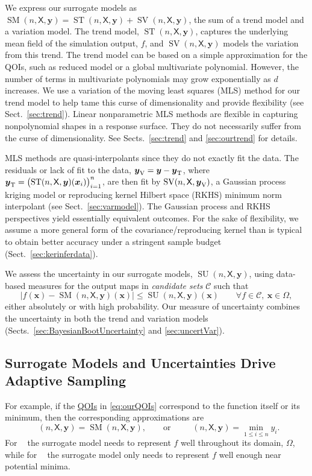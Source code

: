 \documentclass[11pt]{NSFamsart}
\newcommand{\QOIs}{\hyperlink{QOIlink}{QOIs}\xspace}
\DeclareMathOperator{\SURR}{SM} %
\DeclareMathOperator{\STREND}{ST} %
\DeclareMathOperator{\SVAR}{SV} %
\newcommand{\MLS}{\textrm{MLS}\xspace} %
\DeclareMathOperator{\MIN}{MIN}
\DeclareMathOperator{\ID}{ID}
\DeclareMathOperator{\APPMIN}{\widehat{\MIN}}
\DeclareMathOperator{\APPID}{\widehat{\ID}}
\DeclareMathOperator{\SURRERR}{SU}
\newcommand{\TREND}{\textup{T}}
\newcommand{\VAR}{\textup{V}}
\newcommand{\mX}{\mathsf{X}}
\newcommand{\bx}{{\boldsymbol{x}}}
\newcommand{\by}{{\boldsymbol{y}}}
\newcommand{\calc}{{\mathcal{C}}}
\def\abs#1{\ensuremath{\left \lvert #1 \right \rvert}}
\begin{document}
We express our surrogate models as $\SURR(n,\mX,\by) = \STREND(n,\mX,\by) + \SVAR(n,\mX,\by)$, the sum of a trend model and a variation model. 
The trend model, $\STREND(n,\mX,\by)$, captures the underlying mean field of the simulation output, $f$, and $\SVAR(n,\mX,\by)$ models the variation from this trend. 
The trend model can be based on a simple approximation for the QOIs, such as reduced model or a global multivariate polynomial.
However, the number of terms in multivariate polynomials may grow exponentially as $d$ increases. We use 
a variation of the moving least squares (\MLS) method \cite{liumovingpartI1997, limovingpartII1996, salehi2013generalized, mederos2003moving} for our trend model to help tame this curse of dimensionality and provide flexibility (see Sect.\ \ref{sec:trend}). Linear nonparametric \MLS methods are flexible in capturing nonpolynomial shapes in a response surface. They do not necessarily suffer from the curse of dimensionality. 
See Sects.\ \ref{sec:trend} and \ref{sec:ourtrend}  for details. 

\MLS methods are quasi-interpolants since they do not exactly fit the data. 
The residuals or lack of fit to the data, $\by_{\VAR} = \by - \by_{\TREND}$, where $\by_{\TREND} = \bigl( \STREND(n,\mX,\by)(\bx_i) \bigr)_{i=1}^n$, are then  fit by $\SVAR(n,\mX,\by_{\VAR})$, a Gaussian process kriging model or reproducing kernel Hilbert space (RKHS) minimum norm interpolant (see Sect.\ \ref{sec:varmodel}). The Gaussian process and RKHS perspectives yield essentially equivalent outcomes. For the sake of flexibility, we assume a more general form of the covariance/reproducing kernel than is typical to obtain better accuracy under a stringent sample budget (Sect.\ \ref{sec:kerinferdata}). 

We assess the uncertainty in our surrogate models, $\SURRERR(n,\mX,\by)$, using data-based measures for the output maps in \emph{candidate sets} $\calc$ such that 
\begin{equation} \label{eq:surrUncert}
\abs{f(\bx)-\SURR(n,\mX,\by)(\bx)} \le \SURRERR(n,\mX,\by)(\bx) \qquad \forall f \in \calc,\ \bx \in \Omega,
\end{equation} 
either absolutely or with high probability. Our measure of uncertainty combines the uncertainty in both the trend and variation models (Sects.\ \ref{sec:BayesianBootUncertainty} and \ref{sec:uncertVar}).

\subsection{Surrogate Models and Uncertainties Drive Adaptive Sampling} 
For example, if the \QOIs in \eqref{eq:ourQOIs} correspond to the function itself or its minimum, then the corresponding approximations are
\begin{equation} \label{eq:QOIhat}
\APPID(n,\mX,\by) = \SURR(n,\mX,\by), \qquad \text{or}\qquad \APPMIN(n,\mX,\by) = \min_{1 \le i \le n} y_i.
\end{equation}
For $\APPID$ the surrogate model needs to represent $f$ well throughout its domain, $\Omega$, while for $\APPMIN$ the surrogate model only needs to represent $f$ well enough near potential minima.
\end{document}
